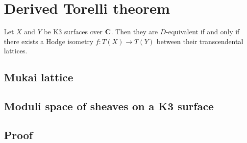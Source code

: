 \section{Derived Torelli theorem}

\begin{theorem}
    Let $X$ and $Y$ be K3 surfaces over $\mathbf C$. Then they are $D$-equivalent if and only if there exists a Hodge isometry $f\colon T(X) \to T(Y)$ between their transcendental lattices.
\end{theorem}

\subsection{Mukai lattice}
\subsection{Moduli space of sheaves on a K3 surface}
\subsection{Proof}


